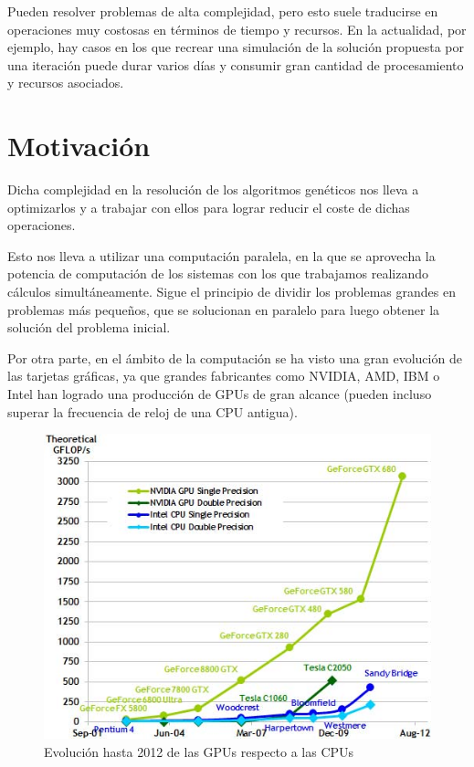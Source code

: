 \bigskip
Pueden resolver problemas de alta complejidad, pero esto suele traducirse en operaciones muy costosas en términos de tiempo y recursos. En la actualidad, por ejemplo, hay casos en los que recrear una simulación de la solución propuesta por una iteración puede durar varios días y consumir gran cantidad de procesamiento y recursos asociados.


\bigskip
\section{Motivación}
\bigskip

Dicha complejidad en la resolución de los algoritmos genéticos nos lleva a optimizarlos y a trabajar con ellos para lograr reducir el coste de dichas operaciones. 

Esto nos lleva a utilizar una computación paralela, en la que se aprovecha la potencia de computación de los sistemas con los que trabajamos realizando cálculos simultáneamente. Sigue el principio de dividir los problemas grandes en problemas más pequeños, que se solucionan en paralelo para luego obtener la solución del problema inicial.

Por otra parte, en el ámbito de la computación se ha visto una gran evolución de las tarjetas gráficas, ya que grandes fabricantes como NVIDIA, AMD, IBM o Intel han logrado una producción de GPUs de gran alcance (pueden incluso superar la frecuencia de reloj de una CPU antigua).

\bigskip
\begin{figure}[h]
	\centering
	\includegraphics[width=0.7\linewidth]{../images/gpu_vs_cpu}
	\caption[Evolución de las GPUs respecto a las CPUs]{Evolución hasta 2012 de las GPUs respecto a las CPUs}
	\label{fig:gpu_vs_cpu}
\end{figure}



